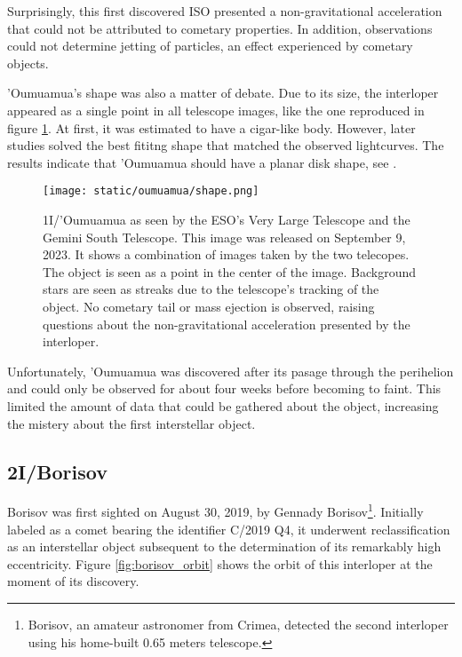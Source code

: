 Surprisingly, this first discovered ISO presented a non-gravitational
acceleration that could not be attributed to cometary properties. In addition,
observations could not determine jetting of particles, an effect experienced by
cometary objects.

'Oumuamua's shape was also a matter of debate. Due to its size, the interloper
appeared as a single point in all telescope images, like the one reproduced in
figure \ref{fig:oumuamua_shape}. At first, it was estimated to have a cigar-like
body. However, later studies solved the best fititng shape that matched the
observed lightcurves. The results indicate that 'Oumuamua should have a planar
disk shape, see \cite{mashchenko2019}.

\begin{figure}[H]
  \centering
  \texttt{[image: static/oumuamua/shape.png]}
  \caption['Oumuamua as seen by the ESO's VLT and GST telescopes]{
    1I/'Oumuamua as seen by the ESO's Very Large Telescope and the Gemini South
    Telescope. This image was released on September 9, 2023. It shows a
    combination of images taken by the two telecopes. The object is seen as
    a point in the center of the image. Background stars are seen as streaks
    due to the telescope's tracking of the object. No cometary tail or mass
    ejection is observed, raising questions about the non-gravitational
    acceleration presented by the interloper.
  }
  \label{fig:oumuamua_shape}
\end{figure}

Unfortunately, 'Oumuamua was discovered after its pasage through the perihelion
and could only be observed for about four weeks before becoming to faint. This
limited the amount of data that could be gathered about the object, increasing
the mistery about the first interstellar object.

\subsection{2I/Borisov}

Borisov was first sighted on August 30, 2019, by Gennady
Borisov\footnote{Borisov, an amateur astronomer from Crimea, detected the second
  interloper using his home-built 0.65 meters telescope.}. Initially labeled as a
comet bearing the identifier C/2019 Q4, it underwent reclassification as an
interstellar object subsequent to the determination of its remarkably high
eccentricity. Figure \ref{fig:borisov_orbit} shows the orbit of this interloper
at the moment of its discovery.

